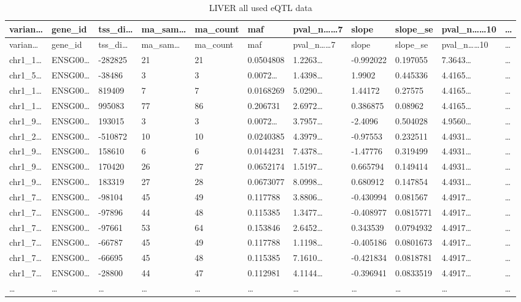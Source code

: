 \documentclass[
]{article}
\begin{document}
\begin{longtable}[]{@{}lllllllllll@{}}
\caption{\label{tab:LIVER-all-used-eQTL-data}LIVER all used eQTL data}\tabularnewline
\toprule
varian\ldots{} & gene\_id & tss\_di\ldots{} & ma\_sam\ldots{} & ma\_count & maf & pval\_n\ldots\ldots7 & slope & slope\_se & pval\_n\ldots\ldots10 & \ldots{}\tabularnewline
\midrule
\endfirsthead
\toprule
varian\ldots{} & gene\_id & tss\_di\ldots{} & ma\_sam\ldots{} & ma\_count & maf & pval\_n\ldots\ldots7 & slope & slope\_se & pval\_n\ldots\ldots10 & \ldots{}\tabularnewline
\midrule
\endhead
chr1\_1\ldots{} & ENSG00\ldots{} & -282825 & 21 & 21 & 0.0504808 & 1.2263\ldots{} & -0.992022 & 0.197055 & 7.3643\ldots{} & \ldots{}\tabularnewline
chr1\_5\ldots{} & ENSG00\ldots{} & -38486 & 3 & 3 & 0.0072\ldots{} & 1.4398\ldots{} & 1.9902 & 0.445336 & 4.4165\ldots{} & \ldots{}\tabularnewline
chr1\_1\ldots{} & ENSG00\ldots{} & 819409 & 7 & 7 & 0.0168269 & 5.0290\ldots{} & 1.44172 & 0.27575 & 4.4165\ldots{} & \ldots{}\tabularnewline
chr1\_1\ldots{} & ENSG00\ldots{} & 995083 & 77 & 86 & 0.206731 & 2.6972\ldots{} & 0.386875 & 0.08962 & 4.4165\ldots{} & \ldots{}\tabularnewline
chr1\_9\ldots{} & ENSG00\ldots{} & 193015 & 3 & 3 & 0.0072\ldots{} & 3.7957\ldots{} & -2.4096 & 0.504028 & 4.9560\ldots{} & \ldots{}\tabularnewline
chr1\_2\ldots{} & ENSG00\ldots{} & -510872 & 10 & 10 & 0.0240385 & 4.3979\ldots{} & -0.97553 & 0.232511 & 4.4931\ldots{} & \ldots{}\tabularnewline
chr1\_9\ldots{} & ENSG00\ldots{} & 158610 & 6 & 6 & 0.0144231 & 7.4378\ldots{} & -1.47776 & 0.319499 & 4.4931\ldots{} & \ldots{}\tabularnewline
chr1\_9\ldots{} & ENSG00\ldots{} & 170420 & 26 & 27 & 0.0652174 & 1.5197\ldots{} & 0.665794 & 0.149414 & 4.4931\ldots{} & \ldots{}\tabularnewline
chr1\_9\ldots{} & ENSG00\ldots{} & 183319 & 27 & 28 & 0.0673077 & 8.0998\ldots{} & 0.680912 & 0.147854 & 4.4931\ldots{} & \ldots{}\tabularnewline
chr1\_7\ldots{} & ENSG00\ldots{} & -98104 & 45 & 49 & 0.117788 & 3.8806\ldots{} & -0.430994 & 0.081567 & 4.4917\ldots{} & \ldots{}\tabularnewline
chr1\_7\ldots{} & ENSG00\ldots{} & -97896 & 44 & 48 & 0.115385 & 1.3477\ldots{} & -0.408977 & 0.0815771 & 4.4917\ldots{} & \ldots{}\tabularnewline
chr1\_7\ldots{} & ENSG00\ldots{} & -97661 & 53 & 64 & 0.153846 & 2.6452\ldots{} & 0.343539 & 0.0794932 & 4.4917\ldots{} & \ldots{}\tabularnewline
chr1\_7\ldots{} & ENSG00\ldots{} & -66787 & 45 & 49 & 0.117788 & 1.1198\ldots{} & -0.405186 & 0.0801673 & 4.4917\ldots{} & \ldots{}\tabularnewline
chr1\_7\ldots{} & ENSG00\ldots{} & -66695 & 45 & 48 & 0.115385 & 7.1610\ldots{} & -0.421834 & 0.0818781 & 4.4917\ldots{} & \ldots{}\tabularnewline
chr1\_7\ldots{} & ENSG00\ldots{} & -28800 & 44 & 47 & 0.112981 & 4.1144\ldots{} & -0.396941 & 0.0833519 & 4.4917\ldots{} & \ldots{}\tabularnewline
\ldots{} & \ldots{} & \ldots{} & \ldots{} & \ldots{} & \ldots{} & \ldots{} & \ldots{} & \ldots{} & \ldots{} & \ldots{}\tabularnewline
\bottomrule
\end{longtable}
\end{document}
